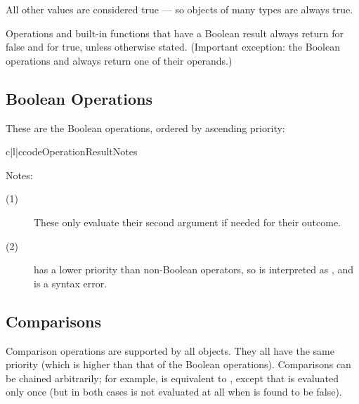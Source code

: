 All other values are considered true --- so objects of many types are
always true.

Operations and built-in functions that have a Boolean result always
return  for false and  for true, unless otherwise
stated.  (Important exception: the Boolean operations
 and  always return one of
their operands.)


\subsection{Boolean Operations \label{boolean}}

These are the Boolean operations, ordered by ascending priority:

\begin{tableiii}{c|l|c}{code}{Operation}{Result}{Notes}
  \hline
\end{tableiii}

\noindent
Notes:

\begin{description}

\item[(1)]
These only evaluate their second argument if needed for their outcome.

\item[(2)]
 has a lower priority than non-Boolean operators, so
 is interpreted as , and  is a syntax error.

\end{description}


\subsection{Comparisons \label{comparisons}}

Comparison operations are supported by all objects.  They all have the
same priority (which is higher than that of the Boolean operations).
Comparisons can be chained arbitrarily; for example,  is equivalent to , except that  is evaluated only once (but
in both cases  is not evaluated at all when  is found to be false).

